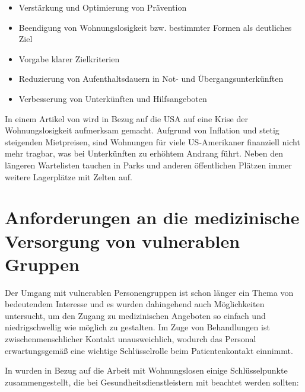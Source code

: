 \begin{itemize}
	\item Verstärkung und Optimierung von Prävention
	\item Beendigung von Wohnungslosigkeit bzw. bestimmter Formen als deutliches Ziel
	\item Vorgabe klarer Zielkriterien
	\item Reduzierung von Aufenthaltsdauern in Not- und Übergangsunterkünften
	\item Verbesserung von Unterkünften und Hilfsangeboten
\end{itemize}

In einem Artikel von \citet{Lopez.2022} wird in Bezug auf die USA auf eine Krise der Wohnungslosigkeit aufmerksam gemacht. Aufgrund von Inflation und stetig steigenden Mietpreisen, sind Wohnungen für viele US-Amerikaner finanziell nicht mehr tragbar, was bei Unterkünften zu erhöhtem Andrang führt. Neben den längeren Wartelisten tauchen in Parks und anderen öffentlichen Plätzen immer weitere Lagerplätze mit Zelten auf.


\section{Anforderungen an die medizinische Versorgung von vulnerablen Gruppen}\label{sec:reqMedCare}

Der Umgang mit vulnerablen Personengruppen ist schon länger ein Thema von bedeutendem Interesse und es wurden dahingehend auch Möglichkeiten untersucht, um den Zugang zu medizinischen Angeboten so einfach und niedrigschwellig wie möglich zu gestalten. Im Zuge von Behandlungen ist zwischenmenschlicher Kontakt unausweichlich, wodurch das Personal erwartungsgemäß eine wichtige Schlüsselrolle beim Patientenkontakt einnimmt.

In \citet{Hwang.2014} wurden in Bezug auf die Arbeit mit Wohnungslosen einige Schlüsselpunkte zusammengestellt, die bei Gesundheitsdienstleistern mit beachtet werden sollten:

